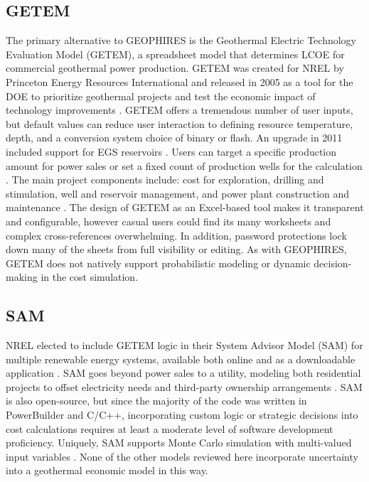 \subsection{GETEM}\label{ch2:getem}
The primary alternative to GEOPHIRES is the Geothermal Electric Technology Evaluation Model (GETEM), a spreadsheet model that determines LCOE for commercial geothermal power production. GETEM was created for NREL by Princeton Energy Resources International and released in 2005 as a tool for the DOE to prioritize geothermal projects and test the economic impact of technology improvements \citep{entingh_volume_2006}. GETEM offers a tremendous number of user inputs, but default values can reduce user interaction to defining resource temperature, depth, and a conversion system choice of binary or flash. An upgrade in 2011 included support for EGS reservoirs \citep{eere_getem_2012}. Users can target a specific production amount for power sales or set a fixed count of production wells for the calculation \citep{mines_geothermal_2008}. The main project components include: cost for exploration, drilling and stimulation, well and reservoir management, and power plant construction and maintenance \citep{entingh_volume_2006}. The design of GETEM as an Excel-based tool makes it transparent and configurable, however casual users could find its many worksheets and complex cross-references overwhelming. In addition, password protections lock down many of the sheets from full visibility or editing. As with GEOPHIRES, GETEM does not natively support probabilistic modeling or dynamic decision-making in the cost simulation.

\subsection{SAM}\label{ch2:sam}
NREL elected to include GETEM logic in their System Advisor Model (SAM) for multiple renewable energy systems, available both online and as a downloadable application \citep{nrel_system_2021}. SAM goes beyond power sales to a utility, modeling both residential projects to offset electricity needs and third-party ownership arrangements \citep{blair_system_2018}. SAM is also open-source, but since the majority of the code was written in PowerBuilder and C/C++, incorporating custom logic or strategic decisions into cost calculations requires at least a moderate level of software development proficiency. Uniquely, SAM supports Monte Carlo simulation with multi-valued input variables \citep{blair_system_2018}. None of the other models reviewed here incorporate uncertainty into a geothermal economic model in this way.

